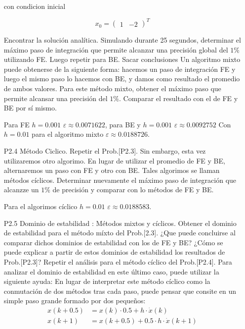 \documentclass{article}
\begin{document}
\begin{itemize}
con condicion inicial

\begin{equation}
x_0 = \begin{pmatrix} 1 & -2\end{pmatrix}^T
 \label{P2.3b} \tag{P2.3b}
\end{equation}

Encontrar la solución analítica. Simulando durante 25 segundos, determinar el máximo paso de integración que permite alcanzar una precisión global del $1\%$ utilizando FE. Luego repetir para BE. Sacar conclusiones
Un algoritmo mixto puede obtenerse de la siguiente forma: hacemos un paso de integración FE y luego el mismo paso lo hacemos con BE, y damos como resultado el promedio de ambos valores. Para este método mixto, obtener el máximo paso que permite alcansar una precisión del $1\%$. Comparar el resultado con el de FE y BE por sí mismo.

Para FE $h = 0.001$ $\varepsilon \approx 0.0071622$, para BE y $h = 0.001$ $\varepsilon \approx 0.0092752 $ 
Con $h = 0.01$ para el algoritmo mixto $\varepsilon \approx 0.0188726$.
\item[P2.4] Método Ciclico. Repetir el Prob.[P2.3]. Sin embargo, esta vez utilizaremos otro algorimo. En lugar de utilizar el promedio de FE y BE, alternaremos un paso con FE y otro con BE. Tales algorimos se llaman métodos cíclicos.
Determinar nuevamente el máximo paso de integración que alcanzze un $1\%$ de precisión y comparar con lo métodos de FE y BE.

Para el algorimos cíclico $h = 0.01$ $\varepsilon \approx 0.0188583$.

\item[P2.5] Dominio de estabilidad : Métodos mixtos y cíclicos. Obtener el dominio de estabilidad para el método míxto del Prob.[2.3]. ¿Que puede concluirse al comparar dichos dominios de estabilidad con los de FE y BE? ¿Cómo se puede explicar a partir de estos dominios de estabilidad los resultados de Prob.[P2.3]?
Repetir el análisis para el método cíclico del Prob.[P2.4]. Para analizar el dominio de estabilidad en este último caso, puede utilizar la siguiente ayuda:
En lugar de interpretar este método cíclico como la conmutación de dos métodos tras cada paso, puede pensar que consite en un simple paso grande formado por dos pequeños:
\begin{align}
	x(k+0.5) &= x(k) \cdot 0.5 + h \cdot \dot{x}(k) \tag{P2.5a} \\
	x(k+1)   &= x(k + 0.5) + 0.5 \cdot h \cdot \dot{x}(k+1) \tag{P2.5b}
\end{align}


\end{itemize}
\end{document}
